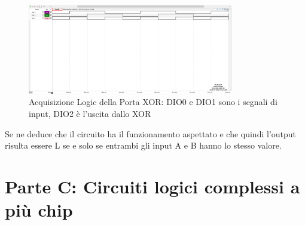 \documentclass[10pt, a4paper, italian]{article}
\begin{document}
\begin{figure}[htb!]
    \centering
    \includegraphics[width=0.8\textwidth]{xor_time.png}
    \caption{Acquisizione Logic della Porta XOR: DIO0 e DIO1 sono i segnali di input, DIO2 è l'uscita dallo XOR}
    \label{pat2}
\end{figure}

Se ne deduce che il circuito ha il funzionamento aspettato e che quindi l'output risulta essere L se e solo se entrambi gli input A e B hanno lo stesso valore.

\setcounter{section}{5}
\section*{Parte C: Circuiti logici complessi a più chip}
\end{document}
